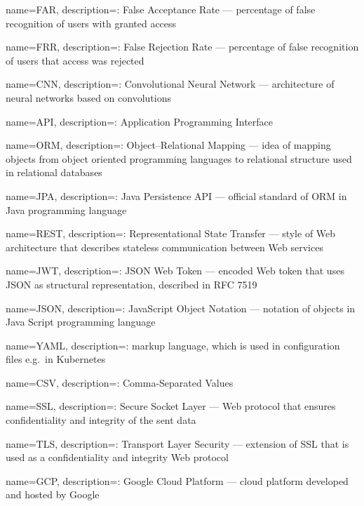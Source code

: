 \makeglossaries

{
name=FAR,
description={: False Acceptance Rate --- percentage of false recognition of users with granted access}
}

{
name=FRR,
description={: False Rejection Rate --- percentage of false recognition of users that access was rejected}
}

{
name=CNN,
description={: Convolutional Neural Network --- architecture of neural networks based on convolutions}
}

{
name=API,
description={: Application Programming Interface}
}

{
name=ORM,
description={: Object–Relational Mapping --- idea of mapping objects from object oriented programming languages to relational structure used in relational databases}
}

{
name=JPA,
description={: Java Persistence API --- official standard of ORM in Java programming language}
}

{
name=REST,
description={: Representational State Transfer --- style of Web architecture that describes stateless communication between Web services}
}

{
name=JWT,
description={: JSON Web Token --- encoded Web token that uses JSON as structural representation, described in RFC 7519}
}

{
name=JSON,
description={: JavaScript Object Notation --- notation of objects in Java Script programming language}
}

{
name=YAML,
description={: markup language, which is used in configuration files e.g.\ in Kubernetes}
}

{
name=CSV,
description={: Comma-Separated Values}
}

{
name=SSL,
description={: Secure Socket Layer --- Web protocol that ensures confidentiality and integrity of the sent data}
}

{
name=TLS,
description={: Transport Layer Security --- extension of SSL that is used as a confidentiality and integrity Web protocol}
}

{
name=GCP,
description={: Google Cloud Platform --- cloud platform developed and hosted by Google}
}


